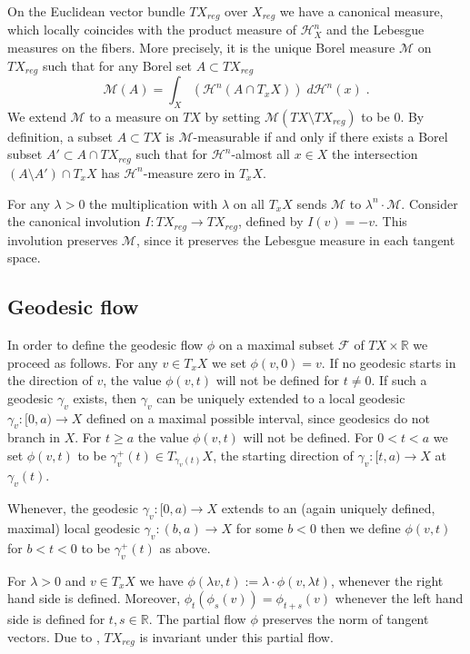 \documentclass[12pt,leqno]{amsart}
\numberwithin{equation}{section}
\theoremstyle{definition}
\theoremstyle{remark}
\newcommand{\R}{\mathbb{R}}
\def\:{\colon}
\begin{document}
 On the Euclidean vector bundle $TX_{reg}$ over $X_{reg}$ we have a canonical measure, which locally coincides with the product measure of $\mathcal H^n _X$ and the Lebesgue measures on the fibers. More precisely,
 it is the unique Borel measure $\mathcal M$ on $TX_{reg}$ such that for any  Borel set $A\subset TX_{reg}$
 $$\mathcal M(A)= \int _X (\mathcal H^n(A \cap T_x X)) \; d\mathcal H^n (x) \; .$$
 We extend $\mathcal M$ to a measure on $TX$ by setting $\mathcal M(TX\setminus TX_{reg})$ to be $0$.
By definition, a subset $A\subset TX$ is $\mathcal M$-measurable if and only if there exists  a Borel subset $A'\subset A\cap TX_{reg}$ such that
for $\mathcal H^n$-almost all $x\in X$ the intersection $(A\setminus A') \cap T_xX$ has $\mathcal H^n$-measure zero in $T_xX$.




 For any $\lambda >0$ the multiplication with $\lambda$  on all $T_xX$ sends $\mathcal M $ to $\lambda ^n \cdot \mathcal M$.
 Consider the canonical involution $I\:TX_{reg}\to TX_{reg}$, defined by $I(v)=-v$.
This involution preserves $\mathcal M$, since it preserves the Lebesgue measure in each tangent space.


\subsection{Geodesic flow}
   In order to define the geodesic flow $\phi$ on a maximal subset   $\mathcal F$ of $TX \times \R $  we proceed as follows.
 For any  $v\in  T_xX$ we set $\phi (v,0)=v$.
 If no geodesic starts in the direction of $v$,
 the value $\phi (v,t)$ will not be defined for $t\neq 0$. If such a geodesic $\gamma_v$ exists, then $\gamma_v$   can be uniquely extended to a  local geodesic $\gamma_v \:[0,a)\to X$  defined on a maximal possible interval, since  geodesics do not branch in $X$.  For $t\geq a$
 the value $\phi (v,t)$ will not be defined. For $0<t<a$ we set $\phi (v,t)$ to be $\gamma _v ^+ (t) \in T_{\gamma _v(t)} X$, the starting direction of $\gamma_v\:[t,a) \to X$ at $\gamma_v (t)$.

 Whenever, the geodesic $\gamma _v\:[0,a)\to X$ extends to an (again uniquely defined, maximal)  local geodesic   $\gamma_v\:(b,a) \to X$ for some $b<0$
 then we define $\phi (v,t)$ for $b<t<0$ to be $\gamma_v ^+ (t) $ as above.


For $\lambda >0$ and $v\in  T_x X$ we have  $\phi (\lambda v,t) :=\lambda \cdot \phi (v,\lambda t)$, whenever the right hand side is defined. Moreover,
 $\phi _t ( \phi _s (v))= \phi _{t+s} (v)$ whenever the left hand side is defined for $t,s\in \R$.
The partial flow $\phi$ preserves the norm of tangent vectors.  Due to \cite{Petparallel},  $TX_{reg}$ is invariant under this partial flow.
\end{document}
